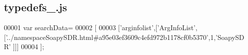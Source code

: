 \subsection{typedefs\+\_.\+js}
\label{typedefs__0_8js_source}

\begin{DoxyCode}
00001 var searchData=
00002 [
00003   [\textcolor{stringliteral}{'arginfolist'},[\textcolor{stringliteral}{'ArgInfoList'},[\textcolor{stringliteral}{'../namespaceSoapySDR.html#a95e03ef3609c4efd972b1178cf0b5370'},1,\textcolor{stringliteral}{'SoapySDR'}
      ]]]
00004 ];
\end{DoxyCode}
